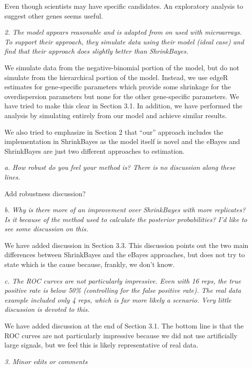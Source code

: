 \documentclass{article}
\newcommand{\comment}[1]{\textit{#1}}
\newcommand{\response}[1]{#1}
\newcommand{\todo}[1]{{\color{red} #1}}
\begin{document}
\response{Even though scientists may have specific candidates. An exploratory analysis to suggest other genes seems useful.}

\comment{2. The model appears reasonable and is adapted from on used with microarrays.  To support their approach, they simulate data using their model (ideal case) and find that their approach does slightly better than ShrinkBayes.}

\response{We simulate data from the negative-binomial portion of the model, but do not simulate from the hierarchical portion of the model. Instead, we use edgeR estimates for gene-specific parameters which provide some shrinkage for the overdispersion parameters but none for the other gene-specific parameters. We have tried to make this clear in Section 3.1. In addition, we have performed the analysis by simulating entirely from our model and achieve similar results.}

\response{We also tried to emphasize in Section 2 that ``our'' approach includes the implementation in ShrinkBayes as the model itself is novel and the eBayes and ShrinkBayes are just two different approaches to estimation.}

\comment{a. How robust do you feel your method is?  There is no discussion along these lines.}

\todo{Add robustness discussion?}

\comment{b.      Why is there more of an improvement over ShrinkBayes with more replicates?  Is it because of the method used to calculate the posterior probabilities?  I'd like to see some discussion on this.}

\response{We have added discussion in Section 3.3. This discussion points out the two main differences between ShrinkBayes and the eBayes approaches, but does not try to state which is the cause because, frankly, we don't know.}

\comment{c.      The ROC curves are not particularly impressive.  Even with 16 reps, the true positive rate is below 50\% (controlling for the false positive rate).  The real data example included only 4 reps, which is far more likely a scenario.  Very little discussion is devoted to this.}

\response{We have added discussion at the end of Section 3.1. The bottom line is that the ROC curves are not particularly impressive because we did not use artificially large signals, but we feel this is likely representative of real data.}

\comment{3.      Minor edits or comments}
\end{document}
